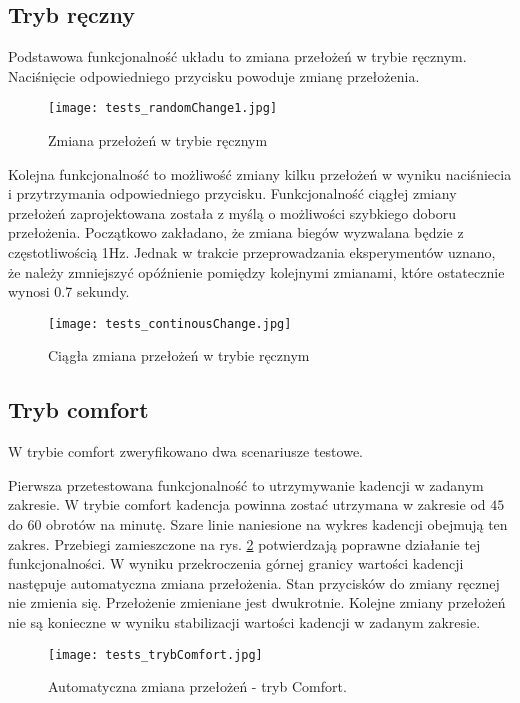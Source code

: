 \subsection{Tryb ręczny}
Podstawowa funkcjonalność układu to zmiana przełożeń w trybie ręcznym. Naciśnięcie odpowiedniego przycisku powoduje zmianę przełożenia.
 
\begin{figure}[h]
    \centering
    \texttt{[image: tests\_randomChange1.jpg]}
    \caption{Zmiana przełożeń w trybie ręcznym}
    \label{fig:tests_randomChange}
\end{figure}

Kolejna funkcjonalność to możliwość zmiany kilku przełożeń w wyniku naciśniecia i przytrzymania odpowiedniego przycisku. Funkcjonalność ciągłej zmiany przełożeń zaprojektowana została z myślą o możliwości szybkiego doboru przełożenia. Początkowo zakładano, że zmiana biegów wyzwalana będzie z częstotliwością 1Hz. Jednak w trakcie przeprowadzania eksperymentów uznano, że należy zmniejszyć opóźnienie pomiędzy kolejnymi zmianami, które ostatecznie wynosi 0.7 sekundy.

\begin{figure}[h]
    \centering
    \texttt{[image: tests\_continousChange.jpg]}
    \caption{Ciągła zmiana przełożeń w trybie ręcznym}
    \label{fig:tests_continousChange}
\end{figure}
\subsection{Tryb comfort}
W trybie comfort zweryfikowano dwa scenariusze testowe. 

Pierwsza przetestowana funkcjonalność to utrzymywanie kadencji w zadanym zakresie. W trybie comfort kadencja powinna zostać utrzymana w zakresie od $45$ do $60$ obrotów na minutę. Szare linie naniesione na wykres kadencji obejmują ten zakres. Przebiegi zamieszczone na rys. \ref{fig:tests_continousChange} potwierdzają poprawne działanie tej funkcjonalności. W wyniku przekroczenia górnej granicy wartości kadencji następuje automatyczna zmiana przełożenia. Stan przycisków do zmiany ręcznej nie zmienia się. Przełożenie zmieniane jest dwukrotnie. Kolejne zmiany przełożeń nie są konieczne w wyniku stabilizacji wartości kadencji w zadanym zakresie. 
\begin{figure}[h]
    \centering
    \texttt{[image: tests\_trybComfort.jpg]}
    \caption{Automatyczna zmiana przełożeń - tryb Comfort.}
    \label{fig:tests_trybComfort}
\end{figure}

